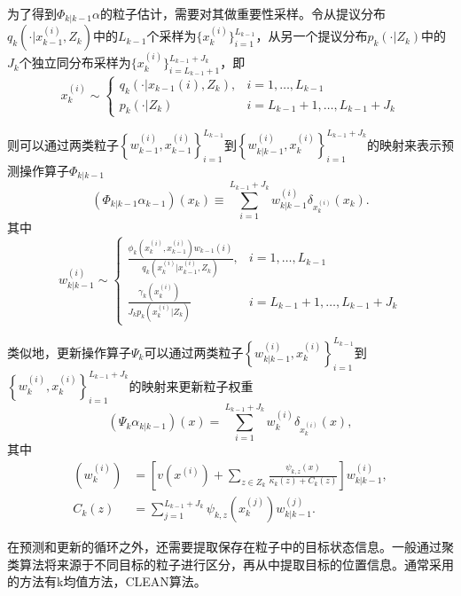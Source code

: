 为了得到$\Phi_{k|k-1}\alpha$的粒子估计，需要对其做重要性采样。令从提议分布$q_k(\cdot |x_{k-1}^{(i)},Z_k)$中的$L_{k-1}$个采样为$\{x_k^{(i)}\}_{i=1}^{L_{k-1}}$，从另一个提议分布$p_k(\cdot |Z_k)$中的$J_k$个独立同分布采样为$\{x_k^{(i)}\}_{i=L_{k-1}+1}^{L_{k-1}+J_k}$，即
\begin{displaymath}
    x_k^{(i)} \sim \left\{ \begin{array}{ll}
      q_k\left(\cdot |x_{k-1}{(i)} ,Z_k\right), & i = 1,\dots,L_{k-1} \\
      p_k\left(\cdot | Z_k\right) & i = L_{k-1}+1,\dots,L_{k-1}+J_k
    \end{array}\right.
\end{displaymath}

则可以通过两类粒子$\left\{w_{k-1}^{(i)},x_{k-1}^{(i)}\right\}_{i=1}^{L_{k-1}}$到$\left\{w_{k|k-1}^{(i)},x_{k}^{(i)}\right\}_{i=1}^{L_{k-1}+J_k}$的映射来表示预测操作算子$\Phi_{k|k-1}$
\begin{equation}\label{PF4}
  (\Phi_{k|k-1}\alpha_{k-1})(x_k) \equiv \sum_{i=1}^{L_{k-1}+J_k}w_{k|k-1}^{(i)}\delta_{x_k^{(i)}}(x_k).
\end{equation}
其中
\begin{displaymath}
    w_{k|k-1}^{(i)} \sim \left\{ \begin{array}{ll}
      \frac{\phi_k\left(x_k^{(i)},x_{k-1}^{(i)}\right)w_{k-1}{(i)}}{q_k\left (x_k^{(i)} |x_{k-1}^{(i)} ,Z_k\right)}, & i = 1,\dots,L_{k-1} \\
      \frac{\gamma_k\left(x_k^{(i)}\right)}{J_k p_k\left(x_k^{(i)} | Z_k\right)} & i = L_{k-1}+1,\dots,L_{k-1}+J_k
    \end{array}\right.
\end{displaymath}

类似地，更新操作算子$\Psi_k$可以通过两类粒子$\left\{w_{k|k-1}^{(i)},x_{k}^{(i)}\right\}_{i=1}^{L_{k-1}}$到$\left\{w_{k}^{(i)},x_{k}^{(i)}\right\}_{i=1}^{L_{k-1}+J_k}$的映射来更新粒子权重
\begin{equation}\label{PF5}
  (\Psi_k \alpha_{k|k-1})(x) =  \sum_{i=1}^{L_{k-1}+J_k}w_{k}^{(i)}\delta_{x_k^{(i)}}(x),
\end{equation}
其中
\begin{align}\label{PF6}
  (w_k^{(i)}) & = [v(x^{(i)}) + \sum_{z\in Z_k}\frac{\psi_{k,z}(x)}{\kappa_k(z)+C_k(z)}]w_{k|k-1}^{(i)},\\
  C_k(z) & = \sum_{j=1}^{L_{k-1}+J_k}\psi_{k,z}(x_{k}^{(j)})w_{k|k-1}^{(j)}.
  \end{align}

在预测和更新的循环之外，还需要提取保存在粒子中的目标状态信息\cite{si2016multi}。一般通过聚类算法\cite{clark2007multi}将来源于不同目标的粒子进行区分，再从中提取目标的位置信息。通常采用的方法有k均值方法，CLEAN算法\cite{tobias2008techniques}。

